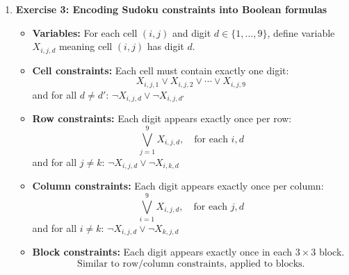 \documentclass{article}
\theoremstyle{theorem}
\theoremstyle{definition}
\theoremstyle{remark}
\begin{document}
\begin{enumerate}
\begin{enumerate}
        \item $\psi_3 = (x \lor y) \land (\neg x \lor y) \land (x \lor \neg y) \land (\neg x \lor \neg y)$\\
        Try all possible assignments of $(x, y)$. None satisfy all clauses.\\
        \textbf{Conclusion:} Not satisfiable.
    \end{enumerate}

    \item \textbf{Exercise 3: Encoding Sudoku constraints into Boolean formulas}
    \begin{itemize}
        \item \textbf{Variables:} For each cell $(i,j)$ and digit $d \in \{1,\dots,9\}$, define variable $X_{i,j,d}$ meaning cell $(i,j)$ has digit $d$.
        \item \textbf{Cell constraints:} Each cell must contain exactly one digit:
        \[
        X_{i,j,1} \lor X_{i,j,2} \lor \cdots \lor X_{i,j,9}
        \]
        and for all $d \ne d'$: $\neg X_{i,j,d} \lor \neg X_{i,j,d'}$

        \item \textbf{Row constraints:} Each digit appears exactly once per row:
        \[
        \bigvee_{j=1}^{9} X_{i,j,d}, \quad \text{for each } i, d
        \]
        and for all $j \ne k$: $\neg X_{i,j,d} \lor \neg X_{i,k,d}$

        \item \textbf{Column constraints:} Each digit appears exactly once per column:
        \[
        \bigvee_{i=1}^{9} X_{i,j,d}, \quad \text{for each } j, d
        \]
        and for all $i \ne k$: $\neg X_{i,j,d} \lor \neg X_{k,j,d}$

        \item \textbf{Block constraints:} Each digit appears exactly once in each $3 \times 3$ block.
        \[
        \text{Similar to row/column constraints, applied to blocks.}
        \]
    \end{itemize}
\end{enumerate}
\end{document}
